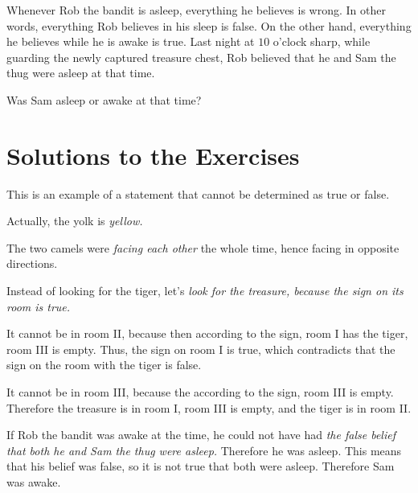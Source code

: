 \documentclass{article}
\begin{document}
\begin{exercise*}
    \label{exercise:pi-2022-4-p12}
    Whenever Rob the bandit is asleep, everything he believes is wrong.
    In other words, everything Rob believes in his sleep is false.
    On the other hand, everything he believes while he is awake is true.
    Last night at $10$ o'clock sharp,
    while guarding the newly captured treasure chest,
    Rob believed that he and Sam the thug were asleep at that time.
    
    Was Sam asleep or awake at that time?
\end{exercise*}

\section*{Solutions to the Exercises}

\begin{soln} 
    This is an example of a statement that cannot be determined as true or false. 
\end{soln}

\begin{soln} 
    Actually, the yolk is \textit{yellow.}
\end{soln}

\begin{soln} 
    The two camels were \textit{facing each other} the whole time, hence facing in opposite directions.
\end{soln}

\begin{soln} 
    Instead of looking for the tiger, let's \textit{look for the treasure, because the sign on its room is true.}
    
    It cannot be in room II, because then according to the sign, room I has the tiger, room III is empty.
    Thus, the sign on room I is true, which contradicts that the sign on the room with the tiger is false.
    
    It cannot be in room III, because the according to the sign, room III is empty.
    Therefore the treasure is in room I, room III is empty, and the tiger is in room II.
\end{soln}

\begin{soln} 
    If Rob the bandit was awake at the time, he could not have had \textit{the false belief
    that both he and Sam the thug were asleep.}
    Therefore he was asleep. This means that his belief was false,
    so it is not true that both were asleep.
    Therefore Sam was awake.
\end{soln}
\end{document}

